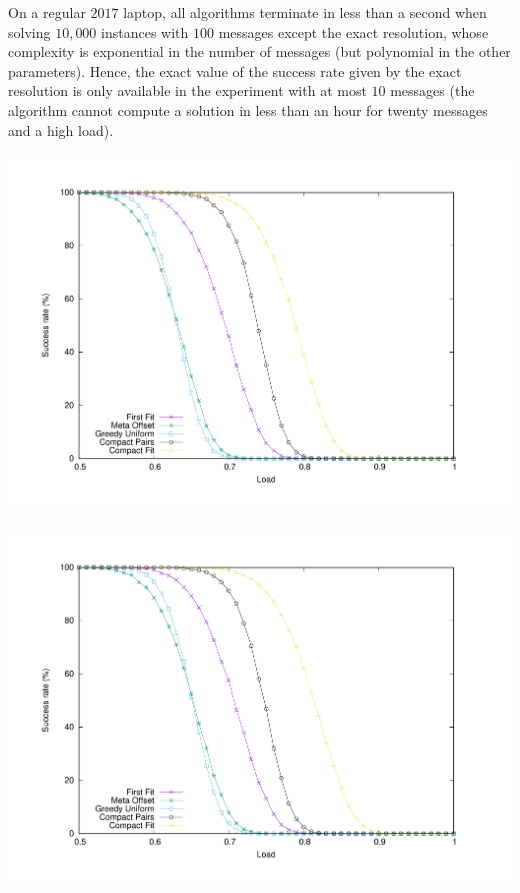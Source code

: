 \documentclass[pdflatex,sn-mathphys,iicol]{sn-jnl}%
\theoremstyle{thmstyleone}%
\theoremstyle{thmstyletwo}%
\theoremstyle{thmstylethree}%
\begin{document}
On a regular $2017$ laptop, all algorithms terminate in less than a second when solving $10,000$ instances with $100$ messages except the exact resolution, whose complexity is exponential in the number of messages (but polynomial in the other parameters). Hence, the exact value of the success rate given by the exact resolution is only available in the experiment with at most $10$ messages (the algorithm cannot compute a solution in less than an hour for twenty messages and a high load). 



\begin{center}
\includegraphics[scale=0.275]{100messBig}

\label{fig:100messBig}
\end{center} 

\begin{center}  
\includegraphics[scale=0.275]{100messSmall}
\label{fig:100messSmall}
\end{center}
\end{document}
